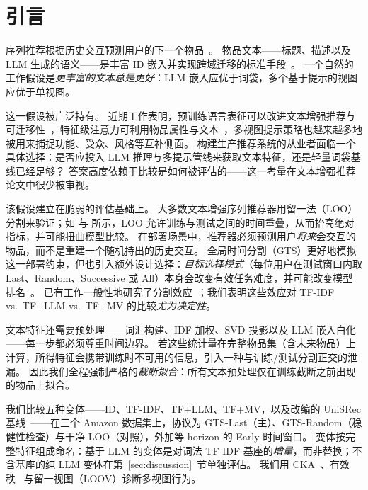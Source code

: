 \documentclass[sigconf,natbib=true,anonymous]{acmart}
\newcommand{\tfidf}{\textsc{TF-IDF}\xspace}
\newcommand{\llm}{\textsc{LLM}\xspace}
\newcommand{\tfllm}{\textsc{TF+LLM}\xspace}
\newcommand{\tfmv}{\textsc{TF+MV}\xspace}
\begin{document}
\maketitle

\section{引言}
\label{sec:intro}

序列推荐根据历史交互预测用户的下一个物品~\cite{kang2018sasrec,sun2019bert4rec,hidasi2016gru4rec}。
物品文本——标题、描述以及 LLM 生成的语义——是丰富 ID 嵌入并实现跨域迁移的标准手段~\cite{hou2022unisrec,bao2023tallrec}。
一个自然的工作假设是\emph{更丰富的文本总是更好}：LLM 嵌入应优于词袋，多个基于提示的视图应优于单视图。

这一假设被广泛持有。
近期工作表明，预训练语言表征可以改进文本增强推荐与可迁移性~\cite{hou2022unisrec,li2023recformer,bao2023tallrec}，特征级注意力可利用物品属性与文本~\cite{zhang2019fdsa}，多视图提示策略也越来越多地被用来捕捉功能、受众、风格等互补侧面。
构建生产推荐系统的从业者面临一个具体选择：是否应投入 LLM 推理与多提示管线来获取文本特征，还是轻量词袋基线已经足够？
答案高度依赖于比较是如何被评估的——这一考量在文本增强推荐论文中很少被审视。

该假设建立在脆弱的评估基础上。
大多数文本增强序列推荐器用留一法（LOO）分割来验证；如 \citet{ji2023evaluation} 与 \citet{sun2023reevaluation} 所示，LOO 允许训练与测试之间的时间重叠，从而抬高绝对指标，并可能扭曲模型比较。
在部署场景中，推荐器必须预测用户\emph{将来}会交互的物品，而不是重建一个随机持出的历史交互。
全局时间分割（GTS）更好地模拟这一部署约束，但也引入额外设计选择：\emph{目标选择模式}（每位用户在测试窗口内取 Last、Random、Successive 或 All）本身会改变有效任务难度，并可能改变模型排名~\cite{gusak2025time}。
已有工作一般性地研究了分割效应~\cite{meng2020temporal,ji2023evaluation}；我们表明这些效应对 \tfidf vs.\ \tfllm vs.\ \tfmv 的比较\emph{尤为决定性}。

文本特征还需要预处理——词汇构建、IDF 加权、SVD 投影以及 LLM 嵌入白化——每一步都必须尊重时间边界。
若这些统计量在完整物品集（含未来物品）上计算，所得特征会携带训练时不可用的信息，引入一种与训练/测试分割正交的泄漏。
因此我们全程强制严格的\emph{截断拟合}：所有文本预处理仅在训练截断之前出现的物品上拟合。

我们比较五种变体——ID、\tfidf、\tfllm、\tfmv，以及改编的 UniSRec 基线~\cite{hou2022unisrec}——在三个 Amazon 数据集上，协议为 GTS-Last（主）、GTS-Random（稳健性检查）与干净 LOO（对照），外加等 horizon 的 Early 时间窗口。
变体按完整特征组成命名：基于 \llm 的变体是对词法 \tfidf 基座的\emph{增量}，而非替换；不含基座的纯 LLM 变体在第~\ref{sec:discussion}~节单独评估。
我们用 CKA~\cite{kornblith2019cka}、有效秩~\cite{roy2007effective} 与留一视图（LOOV）诊断多视图行为。
\end{document}
